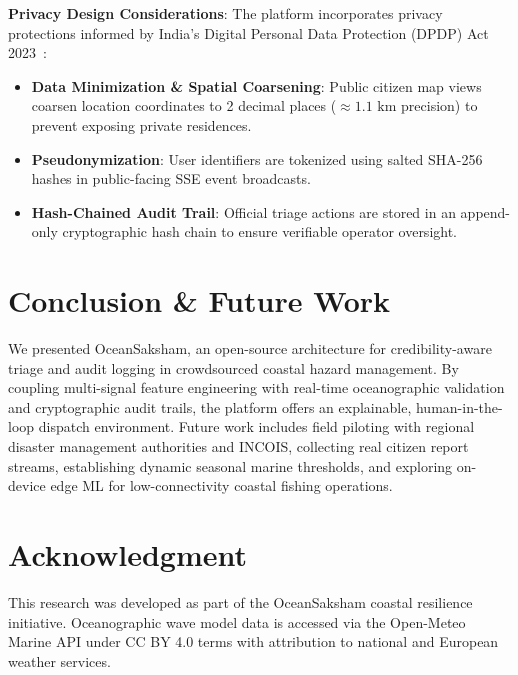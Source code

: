 \documentclass[conference]{IEEEtran}
\begin{document}
\textbf{Privacy Design Considerations}:
The platform incorporates privacy protections informed by India's Digital Personal Data Protection (DPDP) Act 2023~\cite{dpdpact2023india}:
\begin{itemize}
    \item \textbf{Data Minimization \& Spatial Coarsening}: Public citizen map views coarsen location coordinates to 2 decimal places ($\approx 1.1\text{ km}$ precision) to prevent exposing private residences.
    \item \textbf{Pseudonymization}: User identifiers are tokenized using salted SHA-256 hashes in public-facing SSE event broadcasts.
    \item \textbf{Hash-Chained Audit Trail}: Official triage actions are stored in an append-only cryptographic hash chain to ensure verifiable operator oversight.
\end{itemize}

\section{Conclusion \& Future Work}
We presented OceanSaksham, an open-source architecture for credibility-aware triage and audit logging in crowdsourced coastal hazard management. By coupling multi-signal feature engineering with real-time oceanographic validation and cryptographic audit trails, the platform offers an explainable, human-in-the-loop dispatch environment. Future work includes field piloting with regional disaster management authorities and INCOIS, collecting real citizen report streams, establishing dynamic seasonal marine thresholds, and exploring on-device edge ML for low-connectivity coastal fishing operations.

\section*{Acknowledgment}
This research was developed as part of the OceanSaksham coastal resilience initiative. Oceanographic wave model data is accessed via the Open-Meteo Marine API under CC BY 4.0 terms with attribution to national and European weather services.



\end{document}
